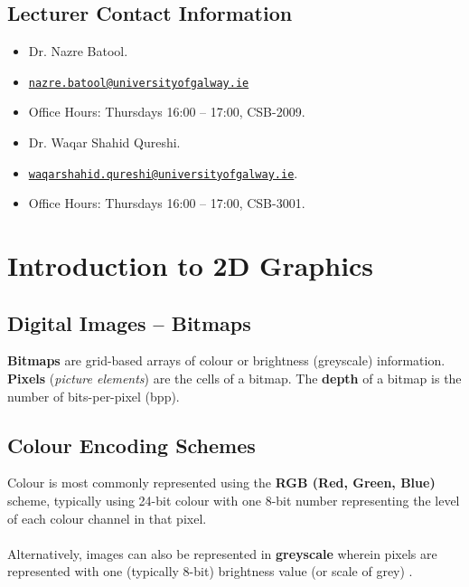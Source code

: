 \documentclass[a4paper,11pt]{article}
\begin{document}
\subsection{Lecturer Contact Information}
\begin{multicols}{2}
    \begin{itemize}
        \item   Dr. Nazre Batool.
        \item   \href{mailto://nazre.batool@universityofgalway.ie}{\texttt{nazre.batool@universityofgalway.ie}}
        \item   Office Hours: Thursdays 16:00 -- 17:00, CSB-2009.

        \item   Dr. Waqar Shahid Qureshi.
        \item   \href{mailto://waqarshahid.qureshi@universityofgalway.ie}{\texttt{waqarshahid.qureshi@universityofgalway.ie}}.
        \item   Office Hours: Thursdays 16:00 -- 17:00, CSB-3001.
    \end{itemize}
\end{multicols}

\section{Introduction to 2D Graphics}
\subsection{Digital Images -- Bitmaps}
\textbf{Bitmaps} are grid-based arrays of colour or brightness (greyscale) information.
\textbf{Pixels} (\textit{picture elements}) are the cells of a bitmap.
The \textbf{depth} of a bitmap is the number of bits-per-pixel (bpp).

\subsection{Colour Encoding Schemes}
Colour is most commonly represented using the \textbf{RGB (Red, Green, Blue)} scheme, typically using 24-bit colour
with one 8-bit number representing the level of each colour channel in that pixel.
\\\\
Alternatively, images can also be represented in \textbf{greyscale} wherein pixels are represented with one
(typically 8-bit) brightness value (or scale of grey) .
\end{document}
